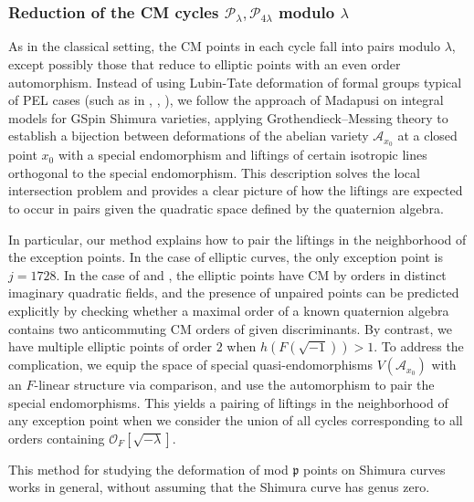 \documentclass{amsart}
\numberwithin{equation}{subsection}
\numberwithin{theorem}{section}
\theoremstyle{definition}
\theoremstyle{remark}
\newcommand{\cA}{\mathcal{A}}
\newcommand{\cO}{\mathcal{O}}
\newcommand{\fp}{\mathfrak{p}}
\begin{document}
\subsubsection{Reduction of the CM cycles $\mathcal{P}_{\lambda}, \mathcal{P}_{4\lambda}$ modulo $\lambda$} \label{sec:redCMmodlambda}
As in the classical setting, the CM points in each cycle fall into pairs modulo $\lambda$, except possibly those that reduce to elliptic points with an even order automorphism. 
Instead of using Lubin-Tate deformation of formal groups typical of PEL cases (such as in \cite{MR1030140}, \cite{MR2704678}, \cite{LMPT}), we follow the approach of Madapusi \cite{MR3484114} on integral models for GSpin Shimura varieties, applying Grothendieck–Messing theory to establish a bijection between deformations of the abelian variety $\cA_{x_0}$ at a closed point $x_0$ with a special endomorphism and liftings of certain isotropic lines orthogonal to the special endomorphism. 
This description solves the local intersection problem and provides a clear picture of how the liftings are expected to occur in pairs given the quadratic space defined by the quaternion algebra.  

In particular, our method explains how to pair the liftings in the neighborhood of the exception points. In the case of elliptic curves, the only exception point is $j = 1728$. In the case of \cite{MR2704678} and \cite{MR2414789}, the elliptic points have CM by orders in distinct imaginary quadratic fields, and the presence of unpaired points can be predicted explicitly by checking whether a maximal order of a known quaternion algebra contains two anticommuting CM orders of given discriminants. By contrast, we have multiple elliptic points of order $2$ when $h(F(\sqrt{-1})) > 1$. To address the complication, we equip the space of special quasi-endomorphisms $V(\cA_{x_0})$ with an $F$-linear structure via comparison, and use the automorphism to pair the special endomorphisms. This yields a pairing of liftings in the neighborhood of any exception point when we consider the union of all cycles corresponding to all orders containing $\cO_F[\sqrt{-\lambda}]$.


This method for studying the deformation of mod $\fp$ points on Shimura curves works in general, without assuming that the Shimura curve has genus zero. 
\end{document}
